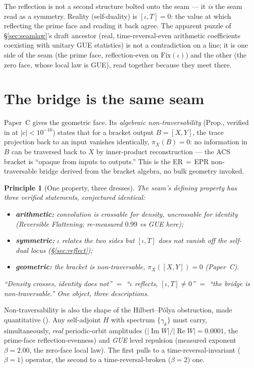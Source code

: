 \documentclass[11pt]{article}
\theoremstyle{definition}
\theoremstyle{plain}
\newtheorem{principle}{Principle}
\begin{document}
The reflection is not a second structure bolted onto the seam --- it \emph{is} the seam read as
a symmetry. Reality (self-duality) is $[\iota,T]=0$: the value at which reflecting the prime
face and reading it back agree. The apparent puzzle of \S\ref{sec:seamlaw}'s draft ancestor
(real, time-reversal-even arithmetic coefficients coexisting with unitary GUE statistics) is not
a contradiction on a line; it is one side of the seam (the prime face, reflection-even on
$\mathrm{Fix}(\iota)$) and the other (the zero face, whose local law is GUE), read together
because they meet there.

\section{The bridge is the same seam}\label{sec:bridge}

Paper~C gives the geometric face. Its \emph{algebraic non-traversability} (Prop., verified in
 at $|c|<10^{-16}$) states that for a bracket output
$B=[X,Y]$, the trace projection back to an input vanishes identically, $\pi_X(B)=0$: no
information in $B$ can be traversed back to $X$ by inner-product reconstruction --- the ACS
bracket is ``opaque from inputs to outputs.'' This is the ER$\,=\,$EPR non-traversable bridge
derived from the bracket algebra, no bulk geometry invoked.

\begin{principle}[One property, three dresses]\label{prin:one}
The seam's defining property has three verified statements, conjectured identical:
\begin{itemize}[nosep]
  \item \textbf{arithmetic:} convolution is \emph{crossable for density, uncrossable for
        identity} (\textit{Reversible Flattening}; re-measured $0.99$ vs GUE here);
  \item \textbf{symmetric:} $\iota$ relates the two sides but $[\iota,T]$ does not vanish off
        the self-dual locus (\S\ref{sec:reflect});
  \item \textbf{geometric:} the bracket is \emph{non-traversable}, $\pi_X([X,Y])=0$ (Paper~C).
\end{itemize}
``Density crosses, identity does not'' $=$ ``$\iota$ reflects, $[\iota,T]\neq 0$'' $=$ ``the
bridge is non-traversable.'' One object, three descriptions.
\end{principle}

Non-traversability is also the shape of the Hilbert--P\'olya obstruction, made quantitative
(). Any self-adjoint $H$ with spectrum $\{\gamma_k\}$ must
carry, simultaneously, \emph{real} periodic-orbit amplitudes ($|\!\operatorname{Im}W|/|\!\operatorname{Re}W|
= 0.0001$, the prime-face reflection-evenness) and \emph{GUE} level repulsion (measured exponent
$\beta = 2.00$, the zero-face local law). The first pulls to a time-reversal-invariant ($\beta=1$)
operator, the second to a time-reversal-broken ($\beta=2$) one.
\end{document}
